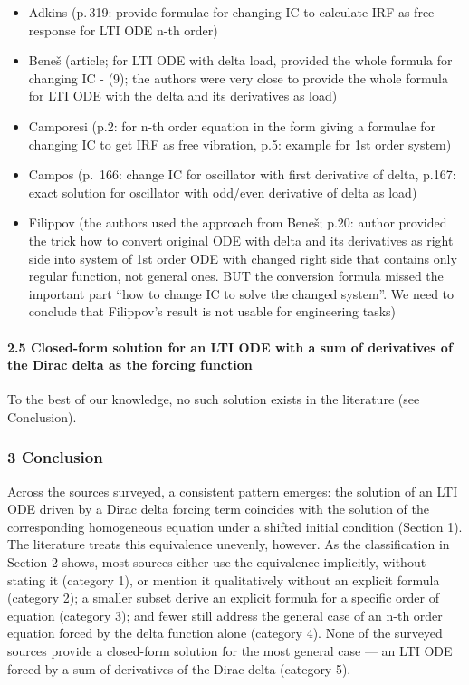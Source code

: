 \documentclass[
  11pt,
]{article}
\providecommand{\tightlist}{%
  \setlength{\itemsep}{0pt}\setlength{\parskip}{0pt}}
\begin{document}
\begin{itemize}
\tightlist
\item
  Adkins (p.\,319: provide formulae for changing IC to calculate IRF as
  free response for LTI ODE n-th order)
\item
  Beneš (article; for LTI ODE with delta load, provided the whole
  formula for changing IC - (9); the authors were very close to provide
  the whole formula for LTI ODE with the delta and its derivatives as
  load)
\item
  Camporesi (p.2: for n-th order equation in the form giving a formulae
  for changing IC to get IRF as free vibration, p.5: example for 1st
  order system)
\item
  Campos (p.~166: change IC for oscillator with first derivative of
  delta, p.167: exact solution for oscillator with odd/even derivative
  of delta as load)
\item
  Filippov (the authors used the approach from Beneš; p.20: author
  provided the trick how to convert original ODE with delta and its
  derivatives as right side into system of 1st order ODE with changed
  right side that contains only regular function, not general ones. BUT
  the conversion formula missed the important part ``how to change IC to
  solve the changed system''. We need to conclude that Filippov's result
  is not usable for engineering tasks)
\end{itemize}

\hypertarget{closed-form-solution-for-an-lti-ode-with-a-sum-of-derivatives-of-the-dirac-delta-as-the-forcing-function}{%
\paragraph{2.5 Closed-form solution for an LTI ODE with a sum of
derivatives of the Dirac delta as the forcing
function}\label{closed-form-solution-for-an-lti-ode-with-a-sum-of-derivatives-of-the-dirac-delta-as-the-forcing-function}}

To the best of our knowledge, no such solution exists in the literature
(see Conclusion).

\hypertarget{conclusion}{%
\subsubsection{3 Conclusion}\label{conclusion}}

Across the sources surveyed, a consistent pattern emerges: the solution
of an LTI ODE driven by a Dirac delta forcing term coincides with the
solution of the corresponding homogeneous equation under a shifted
initial condition (Section 1). The literature treats this equivalence
unevenly, however. As the classification in Section 2 shows, most
sources either use the equivalence implicitly, without stating it
(category 1), or mention it qualitatively without an explicit formula
(category 2); a smaller subset derive an explicit formula for a specific
order of equation (category 3); and fewer still address the general case
of an n-th order equation forced by the delta function alone (category
4). None of the surveyed sources provide a closed-form solution for the
most general case --- an LTI ODE forced by a sum of derivatives of the
Dirac delta (category 5).
\end{document}
